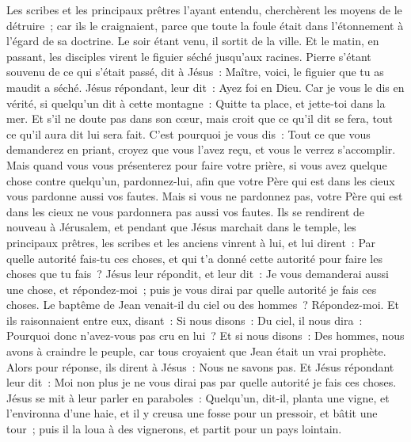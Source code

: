 \begin{multicols}{2}
Les scribes et les principaux prêtres l'ayant entendu, cherchèrent les moyens de le détruire~; car ils le craignaient, parce que toute la foule était dans l'étonnement à l’égard de sa doctrine.
Le soir étant venu, il sortit de la ville.
Et le matin, en passant, les disciples virent le figuier séché jusqu'aux racines.
Pierre s'étant souvenu de ce qui s'était passé, dit à Jésus~: Maître, voici, le figuier que tu as maudit a séché.
Jésus répondant, leur dit~: Ayez foi en Dieu.
Car je vous le dis en vérité, si quelqu'un dit à cette montagne~: Quitte ta place, et jette-toi dans la mer. Et s'il ne doute pas dans son cœur, mais croit que ce qu'il dit se fera, tout ce qu'il aura dit lui sera fait.
C'est pourquoi je vous dis~: Tout ce que vous demanderez en priant, croyez que vous l'avez reçu, et vous le verrez s'accomplir.
Mais quand vous vous présenterez pour faire votre prière, si vous avez quelque chose contre quelqu'un, pardonnez-lui, afin que votre Père qui est dans les cieux vous pardonne aussi vos fautes.
Mais si vous ne pardonnez pas, votre Père qui est dans les cieux ne vous pardonnera pas aussi vos fautes.
Ils se rendirent de nouveau à Jérusalem, et pendant que Jésus marchait dans le temple, les principaux prêtres, les scribes et les anciens vinrent à lui,
et lui dirent~: Par quelle autorité fais-tu ces choses, et qui t'a donné cette autorité pour faire les choses que tu fais~?
Jésus leur répondit, et leur dit~: Je vous demanderai aussi une chose, et répondez-moi~; puis je vous dirai par quelle autorité je fais ces choses.
Le baptême de Jean venait-il du ciel ou des hommes~? Répondez-moi.
Et ils raisonnaient entre eux, disant~: Si nous disons~: Du ciel, il nous dira~: Pourquoi donc n'avez-vous pas cru en lui~?
Et si nous disons~: Des hommes, nous avons à craindre le peuple, car tous croyaient que Jean était un vrai prophète.
Alors pour réponse, ils dirent à Jésus~: Nous ne savons pas. Et Jésus répondant leur dit~: Moi non plus je ne vous dirai pas par quelle autorité je fais ces choses.
\VerseOne{}Jésus se mit à leur parler en paraboles~: Quelqu'un, dit-il, planta une vigne, et l'environna d'une haie, et il y creusa une fosse pour un pressoir, et bâtit une tour~; puis il la loua à des vignerons, et partit pour un pays lointain.

\end{multicols}
